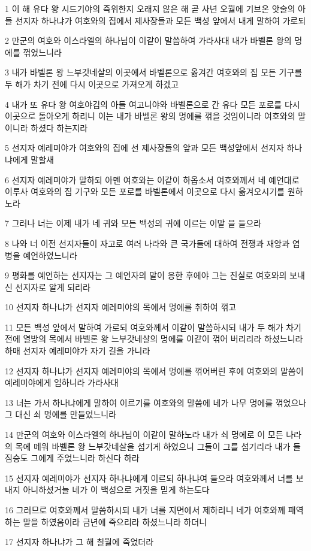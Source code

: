 \par 1 이 해 유다 왕 시드기야의 즉위한지 오래지 않은 해 곧 사년 오월에 기브온 앗술의 아들 선지자 하나냐가 여호와의 집에서 제사장들과 모든 백성 앞에서 내게 말하여 가로되
\par 2 만군의 여호와 이스라엘의 하나님이 이같이 말씀하여 가라사대 내가 바벨론 왕의 멍에를 꺾었느니라
\par 3 내가 바벨론 왕 느부갓네살의 이곳에서 바벨론으로 옮겨간 여호와의 집 모든 기구를 두 해가 차기 전에 다시 이곳으로 가져오게 하겠고
\par 4 내가 또 유다 왕 여호야김의 아들 여고니야와 바벨론으로 간 유다 모든 포로를 다시 이곳으로 돌아오게 하리니 이는 내가 바벨론 왕의 멍에를 꺾을 것임이니라 여호와의 말이니라 하셨다 하는지라
\par 5 선지자 예레미야가 여호와의 집에 선 제사장들의 앞과 모든 백성앞에서 선지자 하나냐에게 말할새
\par 6 선지자 예레미야가 말하되 아멘 여호와는 이같이 하옵소서 여호와께서 네 예언대로 이루사 여호와의 집 기구와 모든 포로를 바벨론에서 이곳으로 다시 옮겨오시기를 원하노라
\par 7 그러나 너는 이제 내가 네 귀와 모든 백성의 귀에 이르는 이말 을 들으라
\par 8 나와 너 이전 선지자들이 자고로 여러 나라와 큰 국가들에 대하여 전쟁과 재앙과 염병을 예언하였느니라
\par 9 평화를 예언하는 선지자는 그 예언자의 말이 응한 후에야 그는 진실로 여호와의 보내신 선지자로 알게 되리라
\par 10 선지자 하나냐가 선지자 예레미야의 목에서 멍에를 취하여 꺾고
\par 11 모든 백성 앞에서 말하여 가로되 여호와께서 이같이 말씀하시되 내가 두 해가 차기 전에 열방의 목에서 바벨론 왕 느부갓네살의 멍에를 이같이 꺾어 버리리라 하셨느니라 하매 선지자 예레미야가 자기 길을 가니라
\par 12 선지자 하나냐가 선지자 예레미야의 목에서 멍에를 꺾어버린 후에 여호와의 말씀이 예레미야에게 임하니라 가라사대
\par 13 너는 가서 하나냐에게 말하여 이르기를 여호와의 말씀에 네가 나무 멍에를 꺾었으나 그 대신 쇠 멍에를 만들었느니라
\par 14 만군의 여호와 이스라엘의 하나님이 이같이 말하노라 내가 쇠 멍에로 이 모든 나라의 목에 메워 바벨론 왕 느부갓네살을 섬기게 하였으니 그들이 그를 섬기리라 내가 들짐승도 그에게 주었느니라 하신다 하라
\par 15 선지자 예레미야가 선지자 하나냐에게 이르되 하나냐여 들으라 여호와께서 너를 보내지 아니하셨거늘 네가 이 백성으로 거짓을 믿게 하는도다
\par 16 그러므로 여호와께서 말씀하시되 내가 너를 지면에서 제하리니 네가 여호와께 패역하는 말을 하였음이라 금년에 죽으리라 하셨느니라 하더니
\par 17 선지자 하나냐가 그 해 칠월에 죽었더라

